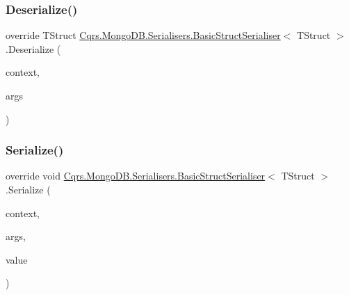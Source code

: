 \subsubsection{\texorpdfstring{Deserialize()}{Deserialize()}}
{\footnotesize\ttfamily override T\+Struct \hyperlink{classCqrs_1_1MongoDB_1_1Serialisers_1_1BasicStructSerialiser}{Cqrs.\+Mongo\+D\+B.\+Serialisers.\+Basic\+Struct\+Serialiser}$<$ T\+Struct $>$.Deserialize (\begin{DoxyParamCaption}\item[{Bson\+Deserialization\+Context}]{context,  }\item[{Bson\+Deserialization\+Args}]{args }\end{DoxyParamCaption})}

\mbox{\label{classCqrs_1_1MongoDB_1_1Serialisers_1_1BasicStructSerialiser_afeddf8cf8fa5a761f01504795adafa9b}} 
\subsubsection{\texorpdfstring{Serialize()}{Serialize()}}
{\footnotesize\ttfamily override void \hyperlink{classCqrs_1_1MongoDB_1_1Serialisers_1_1BasicStructSerialiser}{Cqrs.\+Mongo\+D\+B.\+Serialisers.\+Basic\+Struct\+Serialiser}$<$ T\+Struct $>$.Serialize (\begin{DoxyParamCaption}\item[{Bson\+Serialization\+Context}]{context,  }\item[{Bson\+Serialization\+Args}]{args,  }\item[{T\+Struct}]{value }\end{DoxyParamCaption})}

